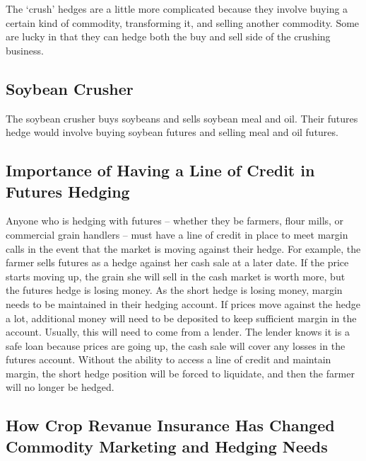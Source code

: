 \documentclass[
]{book}
\begin{document}
The `crush' hedges are a little more complicated because they involve buying a certain kind of commodity, transforming it, and selling another commodity. Some are lucky in that they can hedge both the buy and sell side of the crushing business.

\hypertarget{soybean-crusher}{%
\subsection{Soybean Crusher}\label{soybean-crusher}}

The soybean crusher buys soybeans and sells soybean meal and oil. Their futures hedge would involve buying soybean futures and selling meal and oil futures.

\hypertarget{importance-of-having-a-line-of-credit-in-futures-hedging}{%
\subsection{Importance of Having a Line of Credit in Futures Hedging}\label{importance-of-having-a-line-of-credit-in-futures-hedging}}

Anyone who is hedging with futures -- whether they be farmers, flour mills, or commercial grain handlers -- must have a line of credit in place to meet margin calls in the event that the market is moving against their hedge. For example, the farmer sells futures as a hedge against her cash sale at a later date. If the price starts moving up, the grain she will sell in the cash market is worth more, but the futures hedge is losing money. As the short hedge is losing money, margin needs to be maintained in their hedging account. If prices move against the hedge a lot, additional money will need to be deposited to keep sufficient margin in the account. Usually, this will need to come from a lender. The lender knows it is a safe loan because prices are going up, the cash sale will cover any losses in the futures account. Without the ability to access a line of credit and maintain margin, the short hedge position will be forced to liquidate, and then the farmer will no longer be hedged.

\hypertarget{how-crop-revanue-insurance-has-changed-commodity-marketing-and-hedging-needs}{%
\subsection{How Crop Revanue Insurance Has Changed Commodity Marketing and Hedging Needs}\label{how-crop-revanue-insurance-has-changed-commodity-marketing-and-hedging-needs}}
\end{document}
